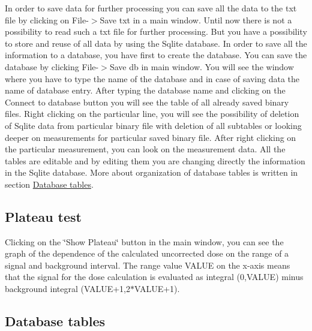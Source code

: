 In order to save data for further processing you can save all the data to the txt file by clicking on {\ttfamily  File-\/$>$Save txt} in a main window. Until now there is not a possibility to read such a txt file for further processing. But you have a possibility to store and reuse of all data by using the {\ttfamily  Sqlite } database. In order to save all the information to a database, you have first to create the database. You can save the database by clicking {\ttfamily  File-\/$>$Save db} in main window.  You will see the window where you have to type the name of the database and in case of saving data the name of database entry. After typing the database name and clicking on the {\ttfamily Connect to database} button you will see the table of all already saved binary files. Right clicking on the particular line, you will see the possibility of deletion of {\ttfamily Sqlite} data from particular binary file with deletion of all subtables or looking deeper on measurements for particular saved binary file. After right clicking on the particular measurement, you can look on the measurement data. All the tables are editable and by editing them you are changing directly the information in the {\ttfamily Sqlite} database. More about organization of database tables is written in section \hyperlink{index_db_tables}{Database tables}.\hypertarget{index_plateau_test}{}\subsection{Plateau test}\label{index_plateau_test}
Clicking on the {\ttfamily \char`\"{}\-Show Plateau\char`\"{}} button in the main window, you can see the graph of the dependence of the calculated uncorrected dose on the range of a signal and background interval. The range value {\ttfamily V\-A\-L\-U\-E} on the x-\/axis means that the signal for the dose calculation is evaluated as integral (0,{\ttfamily V\-A\-L\-U\-E}) minus background integral ({\ttfamily V\-A\-L\-U\-E+1},2$\ast${\ttfamily V\-A\-L\-U\-E+1}). \hypertarget{index_db_tables}{}\subsection{Database tables}\label{index_db_tables}
